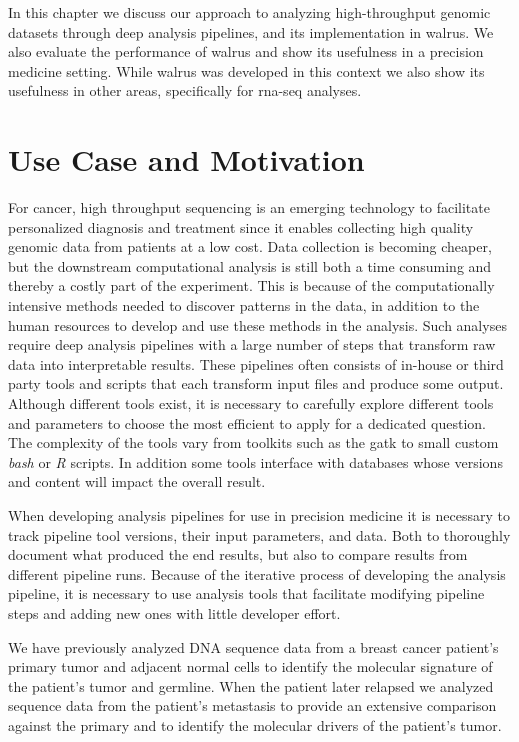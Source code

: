 In this chapter we discuss our approach to analyzing high-throughput genomic
datasets through deep analysis pipelines, and its implementation in 
walrus.\cite{walrus} We also evaluate the performance of walrus and show its
usefulness in a precision medicine setting. While walrus was developed in this
context we also show its usefulness in other areas, specifically for
\gls{rna}-seq analyses. 

\section{Use Case and Motivation} 
For cancer, high throughput sequencing is an emerging technology to facilitate
personalized diagnosis and treatment since it enables collecting high quality
genomic data from patients at a low cost.  Data collection is becoming cheaper,
but the downstream computational analysis is still both a time consuming and
thereby a costly part of the experiment. This is because of the computationally
intensive methods needed to discover patterns in the data, in addition to the
human resources to develop and use these methods in the analysis.  Such analyses
require deep analysis pipelines with a large number of steps that transform raw
data into interpretable results.\cite{diao2015building} These pipelines often
consists of in-house or third party tools and scripts that each transform input
files and produce some output. Although different tools exist, it is necessary
to carefully explore different tools and parameters to choose the most efficient
to apply for a dedicated question.\cite{servant2014bioinformatics} The
complexity of the tools vary from toolkits such as the \gls{gatk} to small
custom \emph{bash} or \emph{R} scripts.  In addition some tools interface with
databases whose versions and content will impact the overall
result.\cite{sboner2015primer}

When developing analysis pipelines for use in precision medicine it is necessary
to track pipeline tool versions, their input parameters, and data. Both to
thoroughly document what produced the end results, but also to compare results
from different pipeline runs.  Because of the iterative process of developing
the analysis pipeline, it is necessary to use analysis tools that facilitate
modifying pipeline steps and adding new ones with little developer effort.

We have previously analyzed DNA sequence data from a breast cancer patient's
primary tumor and adjacent normal cells to identify the molecular signature of
the patient's tumor and germline.  When the patient  later relapsed we analyzed
sequence data from the patient's metastasis to provide an extensive comparison
against the primary and to identify the molecular drivers of the patient's
tumor. 

